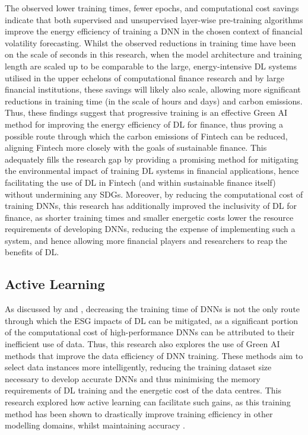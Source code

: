 \documentclass[a4paper, 11pt]{report}
\begin{document}
    The observed lower training times, fewer epochs, and computational cost savings indicate that both supervised and unsupervised layer-wise pre-training algorithms improve the energy efficiency of training a DNN in the chosen context of financial volatility forecasting. Whilst the observed reductions in training time have been on the scale of seconds in this research, when the model architecture and training length are scaled up to be comparable to the large, energy-intensive DL systems utilised in the upper echelons of computational finance research and by large financial institutions, these savings will likely also scale, allowing more significant reductions in training time (in the scale of hours and days) and carbon emissions. Thus, these findings suggest that progressive training is an effective Green AI method for improving the energy efficiency of DL for finance, thus proving a possible route through which the carbon emissions of Fintech can be reduced, aligning Fintech more closely with the goals of sustainable finance. This adequately fills the research gap by providing a promising method for mitigating the environmental impact of training DL systems in financial applications, hence facilitating the use of DL in Fintech (and within sustainable finance itself) without undermining any SDGs. Moreover, by reducing the computational cost of training DNNs, this research has additionally improved the inclusivity of DL for finance, as shorter training times and smaller energetic costs lower the resource requirements of developing DNNs, reducing the expense of implementing such a system, and hence allowing more financial players and researchers to reap the benefits of DL.


    \subsection{Active Learning}

    As discussed by \citet{bender-2021} and \citet{walsh-2021}, decreasing the training time of DNNs is not the only route through which the ESG impacts of DL can be mitigated, as a significant portion of the computational cost of high-performance DNNs can be attributed to their inefficient use of data. Thus, this research also explores the use of Green AI methods that improve the data efficiency of DNN training. These methods aim to select data instances more intelligently, reducing the training dataset size necessary to develop accurate DNNs and thus minimising the memory requirements of DL training and the energetic cost of the data centres. This research explored how active learning can facilitate such gains, as this training method has been shown to drastically improve training efficiency in other modelling domains, whilst maintaining accuracy \citep{ren-2021}.
\end{document}
